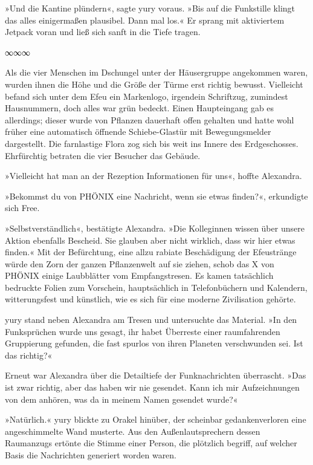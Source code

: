 »Und die Kantine plündern«, sagte yury voraus. »Bis auf die Funkstille klingt das alles einigermaßen plausibel. Dann mal los.« Er sprang mit aktiviertem Jetpack voran und ließ sich sanft in die Tiefe tragen.

\begin{center}
∞∞∞
\end{center}

Als die vier Menschen im Dschungel unter der Häusergruppe angekommen waren, wurden ihnen die Höhe und die Größe der Türme erst richtig bewusst. Vielleicht befand sich unter dem Efeu ein Markenlogo, irgendein Schriftzug, zumindest Hausnummern, doch alles war grün bedeckt. Einen Haupteingang gab es allerdings; dieser wurde von Pflanzen dauerhaft offen gehalten und hatte wohl früher eine automatisch öffnende Schiebe-Glastür mit Bewegungsmelder dargestellt. Die farnlastige Flora zog sich bis weit ins Innere des Erdgeschosses. Ehrfürchtig betraten die vier Besucher das Gebäude.

»Vielleicht hat man an der Rezeption Informationen für uns«, hoffte Alexandra.

»Bekommst du von PHÖNIX eine Nachricht, wenn sie etwas finden?«, erkundigte sich Free.

»Selbstverständlich«, bestätigte Alexandra. »Die Kolleginnen wissen über unsere Aktion ebenfalls Bescheid. Sie glauben aber nicht wirklich, dass wir hier etwas finden.« Mit der Befürchtung, eine allzu rabiate Beschädigung der Efeustränge würde den Zorn der ganzen Pflanzenwelt auf sie ziehen, schob das X von PHÖNIX einige Laubblätter vom Empfangstresen. Es kamen tatsächlich bedruckte Folien zum Vorschein, hauptsächlich in Telefonbüchern und Kalendern, witterungsfest und künstlich, wie es sich für eine moderne Zivilisation gehörte.

yury stand neben Alexandra am Tresen und untersuchte das Material. »In den Funksprüchen wurde uns gesagt, ihr habet Überreste einer raumfahrenden Gruppierung gefunden, die fast spurlos von ihren Planeten verschwunden sei. Ist das richtig?«

Erneut war Alexandra über die Detailtiefe der Funknachrichten überrascht. »Das ist zwar richtig, aber das haben wir nie gesendet. Kann ich mir Aufzeichnungen von dem anhören, was da in meinem Namen gesendet wurde?«

»Natürlich.« yury blickte zu Orakel hinüber, der scheinbar gedankenverloren eine angeschimmelte Wand musterte. Aus den Außenlautsprechern dessen Raumanzugs ertönte die Stimme einer Person, die plötzlich begriff, auf welcher Basis die Nachrichten generiert worden waren.

